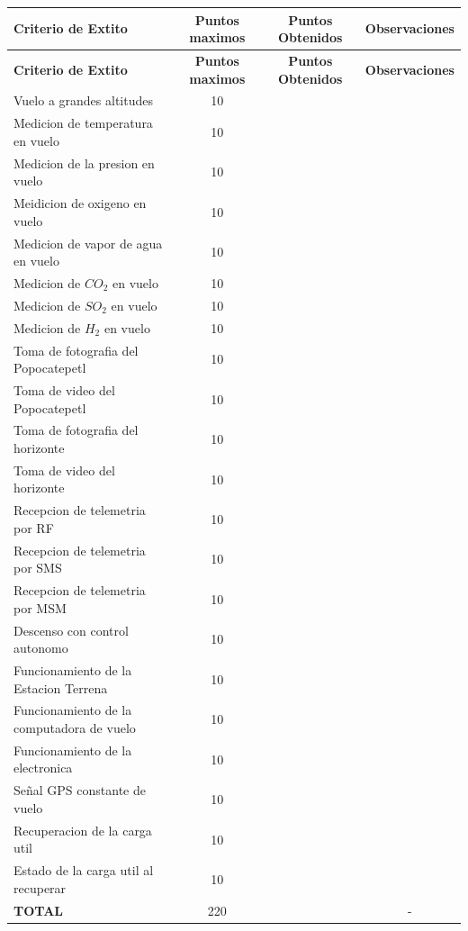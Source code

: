 \documentclass[letterpaper,12pt]{article} %
\begin{document}
    \begin{longtable}{|m{4.3cm}|c|c|c|}
    \hline
    \textbf{Criterio de Extito} & \textbf{Puntos maximos} & \textbf{Puntos Obtenidos} & \textbf{Observaciones} \\
    \hline
    \endfirsthead
    \hline
    \textbf{Criterio de Extito} & \textbf{Puntos maximos} & \textbf{Puntos Obtenidos} & \textbf{Observaciones} \\
    \hline
    \endhead
    Vuelo a grandes altitudes & 10 &  & \\
    \midrule
    Medicion de temperatura en vuelo & 10 &  & \\
    \midrule
    Medicion de la presion en vuelo & 10 &  & \\
    \midrule
    Meidicion de oxigeno en vuelo & 10 &  & \\
    \midrule
    Medicion de vapor de agua en vuelo & 10 &  & \\
    \midrule
    Medicion de $CO_{2}$ en vuelo & 10 &  & \\
    \midrule
    Medicion de $SO_{2}$ en vuelo & 10 &  & \\
    \midrule
    Medicion de $H_{2}$ en vuelo   \phantom{text} & 10 &  & \\
    \midrule
    Toma de fotografia del Popocatepetl & 10 &  & \\
    \midrule
    Toma de video del Popocatepetl & 10 &  & \\
    \midrule
    Toma de fotografia del horizonte & 10 &  & \\
    \midrule
    Toma de video del horizonte & 10 &  & \\
    \midrule
    Recepcion de telemetria por RF & 10 &  & \\
    \midrule
    Recepcion de telemetria por SMS & 10 &  & \\
    \midrule
    Recepcion de telemetria por MSM & 10 &  & \\
    \midrule
    Descenso con control autonomo & 10 &  & \\
    \midrule
    Funcionamiento de la Estacion Terrena & 10 &  & \\
    \midrule
    Funcionamiento de la computadora de vuelo & 10 &  & \\
    \midrule
    Funcionamiento de la electronica & 10 &  & \\
    \midrule
    Señal GPS constante de vuelo & 10 &  & \\
    \midrule
    Recuperacion de la carga util & 10 &  & \\
    \midrule
    Estado de la carga util al recuperar & 10 &  & \\
    \midrule
    \textbf{TOTAL} & 220 &  & -\\
    \hline
    \end{longtable}
\end{document}
